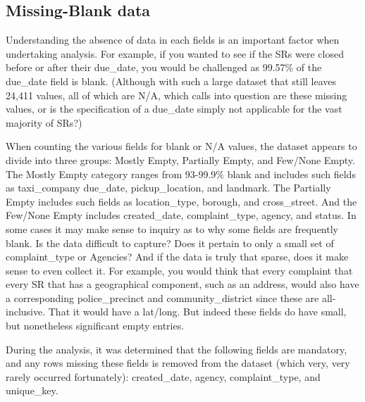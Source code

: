 \documentclass[12pt, titlepage]{article}
\begin{document}
\subsection{Missing-Blank data}

Understanding the absence of data in each fields is an important factor when undertaking analysis. For example, if you wanted to see if the SRs were
closed before or after their due\_date, you would be challenged as 99.57\% of the due\_date field is blank. (Although with such a large dataset
that still leaves 24,411 values, all of which are N/A, which calls into question are these missing values, or is the specification of a
due\_date simply not applicable for the vast majority of SRs?)

When counting the various fields for blank or N/A values, the dataset appears to divide into three groups: Mostly Empty, Partially Empty, and Few/None Empty.
The Mostly Empty category ranges from 93-99.9\% blank and includes such fields as taxi\_company due\_date, pickup\_location, and landmark. The Partially 
Empty includes such fields as location\_type, borough, and cross\_street. And the Few/None Empty includes created\_date, complaint\_type, agency, and status.
In some cases it may make sense to inquiry as to why some fields are frequently blank. Is the data difficult to capture? Does it pertain to only a small set
of complaint\_type or Agencies? And if the data is truly that sparse, does it make sense to even collect it. For example, you would think that every complaint
that every SR that has a geographical component, such as an address, would also have a corresponding police\_precinct and community\_district since these
are all-inclusive. That it would have a lat/long.  But indeed these fields do have small, but nonetheless significant empty entries. 

During the analysis, it was determined that the following fields are mandatory, and any rows missing these fields is removed from the dataset (which very, very
rarely occurred fortunately): created\_date, agency, complaint\_type, and unique\_key. 
\end{document}
